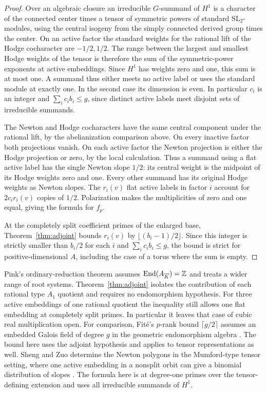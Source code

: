 \begin{proof}
Over an algebraic closure an irreducible \(G\)-summand of \(H^1\)
is a character of the connected center times a tensor of symmetric
powers of standard \(\mathrm{SL}_2\)-modules, using the central
isogeny from the simply connected derived group times the center.
On an active factor the standard weights for the rational lift of
the Hodge cocharacter are \(-1/2,1/2\). The range between the largest
and smallest Hodge weights of the tensor is therefore the sum of
the symmetric-power exponents at active embeddings. Since \(H^1\)
has weights zero and one, this sum is at most one. A summand thus
either meets no active label or uses the standard module at exactly
one. In the second case its dimension is even. In particular
\(c_i\) is an integer and \(\sum_i c_i b_i\le g\), since distinct
active labels meet disjoint sets of irreducible summands.

The Newton and Hodge cocharacters have the same central component
under the rational lift, by the abelianization comparison above.
On every inactive factor both projections vanish. On each active
factor the Newton projection is either the Hodge projection or zero,
by the local calculation. Thus a summand using a flat active label
has the single Newton slope \(1/2\): its central weight is the
midpoint of its Hodge weights zero and one. Every other summand has
its original Hodge weights as Newton slopes. The \(r_i(v)\) flat
active labels in factor \(i\) account for \(2c_i r_i(v)\) copies
of \(1/2\). Polarization makes the multiplicities of zero and one
equal, giving the formula for \(f_p\).

At the completely split coefficient primes of the enlarged base,
Theorem~\ref{thm:adjoint} bounds \(r_i(v)\) by
\(\lfloor(b_i-1)/2\rfloor\). Since this integer is strictly smaller
than \(b_i/2\) for each \(i\) and \(\sum_i c_i b_i\le g\), the
bound is strict for positive-dimensional \(A\), including the case
of a torus where the sum is empty.
\end{proof}

Pink's ordinary-reduction theorem \cite[Theorem~7.1]{pink} assumes
\(\operatorname{End}(A_{\overline K})=\mathbb Z\) and treats a wider range
of root systems. Theorem~\ref{thm:adjoint} isolates the contribution
of each rational type \(A_1\) quotient and requires no endomorphism
hypothesis. For three active embeddings of one rational quotient the
inequality still allows one flat embedding at completely split
primes. In particular it leaves that case of cubic real multiplication
open. For comparison, Fit\'e's \(p\)-rank bound \(\lceil g/2\rceil\)
assumes an embedded Galois field of degree \(g\) in the geometric
endomorphism algebra \cite[Theorem~2]{fite}. The bound here uses the
adjoint hypothesis and applies to tensor representations as well.
Sheng and Zuo determine the Newton polygons in the Mumford-type
tensor setting, where one active embedding in a nonsplit orbit
can give a binomial distribution of slopes
\cite[Theorem~1.2]{shengzuo}. The formula here is at degree-one
primes over the tensor-defining extension and uses all irreducible
summands of \(H^1\).
